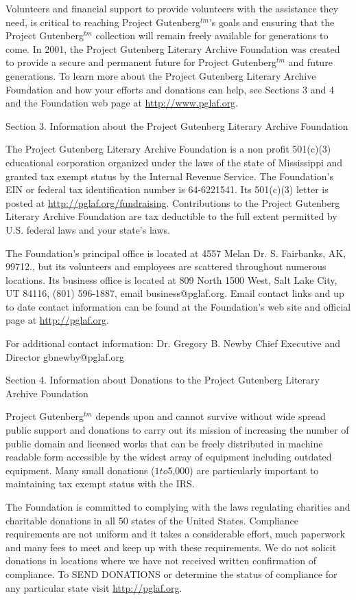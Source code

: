 Volunteers and financial support to provide volunteers with the
assistance they need, is critical to reaching Project Gutenberg$^{tm}$’s
goals and ensuring that the Project Gutenberg$^{tm}$ collection will
remain freely available for generations to come.  In 2001, the Project
Gutenberg Literary Archive Foundation was created to provide a secure
and permanent future for Project Gutenberg$^{tm}$ and future generations.
To learn more about the Project Gutenberg Literary Archive Foundation
and how your efforts and donations can help, see Sections 3 and 4
and the Foundation web page at \url{http://www.pglaf.org}.


Section 3.  Information about the Project Gutenberg Literary Archive
Foundation

The Project Gutenberg Literary Archive Foundation is a non profit
501(c)(3) educational corporation organized under the laws of the
state of Mississippi and granted tax exempt status by the Internal
Revenue Service.  The Foundation’s EIN or federal tax identification
number is 64-6221541.  Its 501(c)(3) letter is posted at
\url{http://pglaf.org/fundraising}.  Contributions to the Project Gutenberg
Literary Archive Foundation are tax deductible to the full extent
permitted by U.S. federal laws and your state’s laws.

The Foundation’s principal office is located at 4557 Melan Dr. S.
Fairbanks, AK, 99712., but its volunteers and employees are scattered
throughout numerous locations.  Its business office is located at
809 North 1500 West, Salt Lake City, UT 84116, (801) 596-1887, email
business@pglaf.org.  Email contact links and up to date contact
information can be found at the Foundation’s web site and official
page at \url{http://pglaf.org}.

For additional contact information:
     Dr. Gregory B. Newby
     Chief Executive and Director
     gbnewby@pglaf.org


Section 4.  Information about Donations to the Project Gutenberg
Literary Archive Foundation

Project Gutenberg$^{tm}$ depends upon and cannot survive without wide
spread public support and donations to carry out its mission of
increasing the number of public domain and licensed works that can be
freely distributed in machine readable form accessible by the widest
array of equipment including outdated equipment.  Many small donations
($1 to $5,000) are particularly important to maintaining tax exempt
status with the IRS.

The Foundation is committed to complying with the laws regulating
charities and charitable donations in all 50 states of the United
States.  Compliance requirements are not uniform and it takes a
considerable effort, much paperwork and many fees to meet and keep up
with these requirements.  We do not solicit donations in locations
where we have not received written confirmation of compliance.  To
SEND DONATIONS or determine the status of compliance for any
particular state visit \url{http://pglaf.org}.

